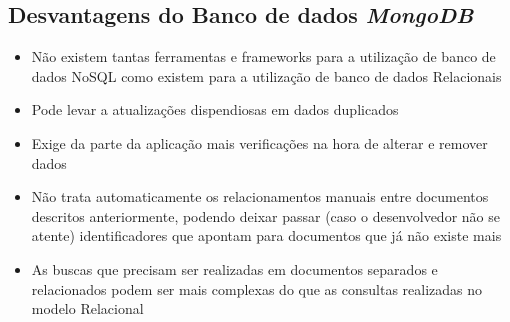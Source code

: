 \subsection{Desvantagens do Banco de dados \textit{MongoDB}}

    
\begin{itemize}
    \item Não existem tantas ferramentas e frameworks para a utilização de banco de dados NoSQL como existem para a utilização de banco de dados Relacionais
    
    
    \item Pode levar a atualizações dispendiosas em dados duplicados
    
    
    \item Exige da parte da aplicação mais verificações na hora de alterar e
          remover dados
    
    \item Não trata automaticamente os relacionamentos manuais entre documentos descritos anteriormente, podendo deixar passar (caso o desenvolvedor não se atente) identificadores que apontam para documentos que já não existe mais
    
    
    \item As buscas que precisam ser realizadas em documentos separados e relacionados podem ser mais complexas do que as consultas realizadas no modelo Relacional
\end{itemize}




